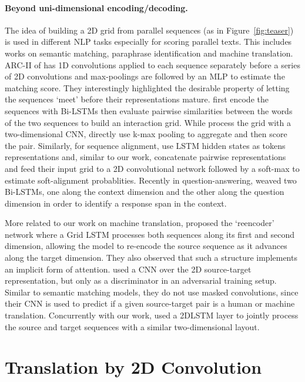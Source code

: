 \documentclass[11pt,a4paper]{article}
\def\fig#1{Figure~\ref{fig:#1}}
\begin{document}
\paragraph{Beyond uni-dimensional encoding/decoding.}
The idea of building a 2D grid from parallel sequences (as in \fig{teaser}) is used in different NLP tasks especially for scoring parallel texts. This includes works on semantic matching, paraphrase identification and machine translation. ARC-II of \citet{hu14nips} has 1D convolutions applied to each sequence separately before a series of 2D convolutions and max-poolings are followed by an MLP to estimate the matching score. They interestingly highlighted the desirable property of letting the sequences `meet' before their representations mature.
\citet{he16naacl, wan16aaai} first encode the sequences with Bi-LSTMs then evaluate pairwise similarities between the words of the two sequences to build an interaction grid. While \citet{he16naacl} process the grid with a two-dimensional CNN, \citet{wan16aaai} directly use k-max pooling to aggregate and then score the pair. Similarly, for sequence alignment, \citet{levy17icml} use LSTM hidden states as tokens representations and, similar to our work, concatenate pairwise representations and feed their input grid to a 2D convolutional network followed by a soft-max to estimate soft-alignment probablities. Recently in question-answering, \citet{raison18arxiv} weaved two Bi-LSTMs, one along the context dimension and the other along the question dimension in order to identify a response span in the context.

More related to our work on machine translation, \citet{kalchbrenner16iclr} proposed the `reencoder' network where a Grid LSTM processes both sequences along its first and second dimension, allowing the model to re-encode the source sequence as it advances along the target dimension. They also observed that such a structure implements an implicit form of attention.
\citet{wu17arxiv} used a CNN over the 2D source-target representation, but only as a discriminator in an adversarial training setup. Similar to semantic matching models, they do not use masked convolutions, since their CNN is used to predict if a given source-target pair is a human or machine translation. 
Concurrently with our work, \citet{bahar18emnlp} used a 2DLSTM layer to jointly process the source and target sequences with a similar two-dimensional layout.




 
\section{Translation by 2D Convolution}
\label{sec:model}
\end{document}
